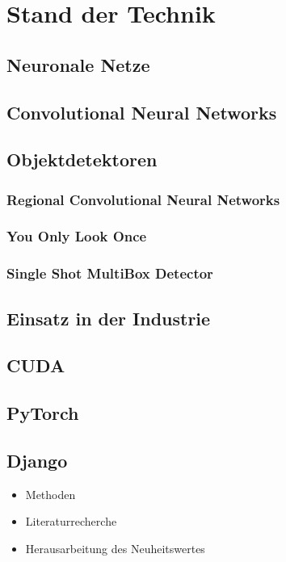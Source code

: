 \chapter{Stand der Technik}

\section{Neuronale Netze}


\section{Convolutional Neural Networks}


\section{Objektdetektoren}

\subsection{Regional Convolutional Neural Networks}

\subsection{You Only Look Once}

\subsection{Single Shot MultiBox Detector}


\section{Einsatz in der Industrie}


\section{CUDA}


\section{PyTorch}


\section{Django}


\begin{itemize}
	\item Methoden
	\item Literaturrecherche
	\item Herausarbeitung des Neuheitswertes 
\end{itemize}
